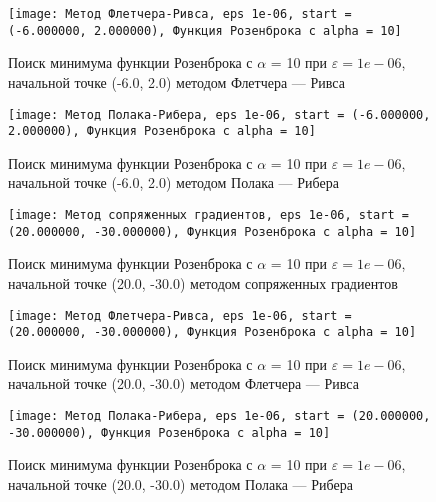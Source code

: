             \begin{figure}[H]
	        \centering
	        \texttt{[image: Метод Флетчера-Ривса, eps 1e-06, start = (-6.000000, 2.000000), Функция Розенброка с alpha = 10]}%
	        \caption{Поиск минимума функции Розенброка с $\alpha$ = 10 при $\varepsilon = 1e-06$, начальной точке (-6.0, 2.0) методом Флетчера --- Ривса}
	        \vspace*{-1.2cm}
            \end{figure}
            
            \begin{figure}[H]
	        \centering
	        \texttt{[image: Метод Полака-Рибера, eps 1e-06, start = (-6.000000, 2.000000), Функция Розенброка с alpha = 10]}%
	        \caption{Поиск минимума функции Розенброка с $\alpha$ = 10 при $\varepsilon = 1e-06$, начальной точке (-6.0, 2.0) методом Полака --- Рибера}
	        \vspace*{-1.2cm}
            \end{figure}
            
            \begin{figure}[H]
	        \centering
	        \texttt{[image: Метод сопряженных градиентов, eps 1e-06, start = (20.000000, -30.000000), Функция Розенброка с alpha = 10]}%
	        \caption{Поиск минимума функции Розенброка с $\alpha$ = 10 при $\varepsilon = 1e-06$, начальной точке (20.0, -30.0) методом сопряженных градиентов}
	        \vspace*{-1.2cm}
            \end{figure}
            
            \begin{figure}[H]
	        \centering
	        \texttt{[image: Метод Флетчера-Ривса, eps 1e-06, start = (20.000000, -30.000000), Функция Розенброка с alpha = 10]}%
	        \caption{Поиск минимума функции Розенброка с $\alpha$ = 10 при $\varepsilon = 1e-06$, начальной точке (20.0, -30.0) методом Флетчера --- Ривса}
	        \vspace*{-1.2cm}
            \end{figure}
            
            \begin{figure}[H]
	        \centering
	        \texttt{[image: Метод Полака-Рибера, eps 1e-06, start = (20.000000, -30.000000), Функция Розенброка с alpha = 10]}%
	        \caption{Поиск минимума функции Розенброка с $\alpha$ = 10 при $\varepsilon = 1e-06$, начальной точке (20.0, -30.0) методом Полака --- Рибера}
	        \vspace*{-1.2cm}
            \end{figure}
            